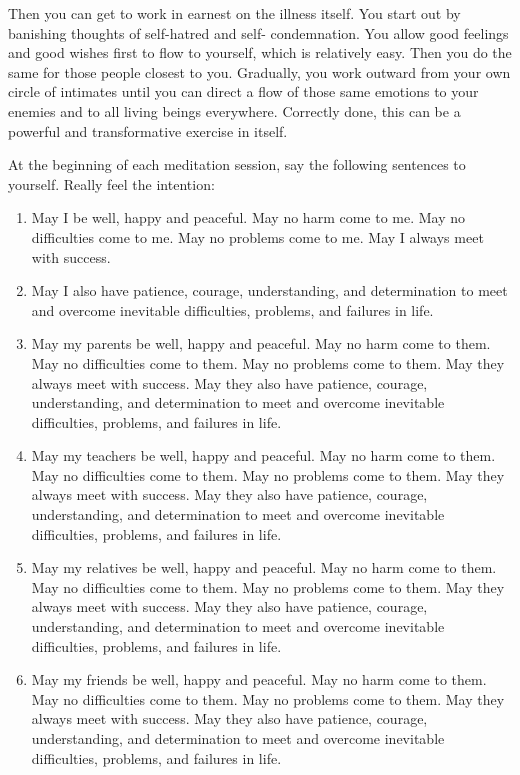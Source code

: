 Then you can get to work in earnest on the illness itself.  You start out by
banishing thoughts of self-hatred and self- condemnation. You allow good
feelings and good wishes first to flow to yourself, which is relatively easy.
Then you do the same for those people closest to you. Gradually, you work
outward from your own circle of intimates until you can direct a flow of those
same emotions to your enemies and to all living beings everywhere. Correctly
done, this can be a powerful and transformative exercise in itself.

At the beginning of each meditation session, say the following sentences to
yourself. Really feel the intention: 

\begin{enumerate}
\item May I be well, happy and peaceful. May
no harm come to me. May no difficulties come to me. May no problems come to me.
May I always meet with success.

\item May I also have patience, courage, understanding, and determination to meet
and overcome inevitable difficulties, problems, and failures in life.

\item May my parents be well, happy and peaceful. May no harm come to them. May no difficulties come to them. May
no problems come to them. May they always meet with success. May they also have patience, courage,
understanding, and determination to meet and overcome inevitable difficulties, problems, and failures in life.

\item May my teachers be well, happy and peaceful. May no harm come to them. May no
difficulties come to them. May no problems come to them. May they always meet
with success. May they also have patience, courage, understanding, and
determination to meet and overcome inevitable difficulties, problems, and
failures in life.

\item May my relatives be well, happy and peaceful. May no harm come to them. May
no difficulties come to them. May no problems come to them. May they always meet
with success. May they also have patience, courage, understanding, and
determination to meet and overcome inevitable difficulties, problems, and
failures in life.

\item May my friends be well, happy and peaceful. May no harm come to them. May no
difficulties come to them. May no problems come to them. May they always meet
with success. May they also have patience, courage, understanding, and
determination to meet and overcome inevitable difficulties, problems, and
failures in life.


\end{enumerate}
